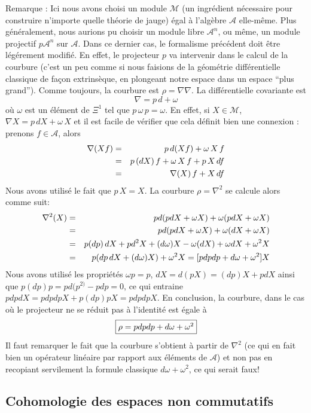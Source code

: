 Remarque : Ici nous avons choisi un module $\mathcal M$ (un ingr\'edient 
n\'ecessaire pour construire n'importe quelle th\'eorie de jauge)
\'egal \`a l'alg\`ebre ${\mathcal A}$ elle-m\^eme. Plus g\'en\'eralement, nous 
aurions pu choisir un module libre ${\mathcal A}^n$, ou m\^eme,  un 
module projectif $p{\mathcal A}^n$ sur $\mathcal A$. 
Dans ce dernier cas, le formalisme pr\'ec\'edent doit \^etre 
l\'eg\'erement modifi\'e. En effet, le projecteur $p$ va intervenir dans 
le calcul de la courbure (c'est un peu comme si nous faisions de la 
g\'eom\'etrie diff\'erentielle classique de fa\c con extrins\`eque, 
en plongeant notre espace dans un espace ``plus grand''). Comme 
toujours, la courbure est $\rho  =  \nabla \nabla$. La 
diff\'erentielle covariante est $$ \nabla = p \, d + \omega$$ o\`u 
$\omega$ est un \'el\'ement de $\Xi^{1}$ tel que $p \, \omega \, p = \omega$. En effet, si $X \in 
{\mathcal M}$, $\nabla X = p \, dX + \omega \, X$ et il est facile de 
v\'erifier que cela d\'efinit bien une connexion : prenons $f \in 
{\mathcal A}$, alors
\begin{eqnarray*}
\nabla(Xf) &=& p \, d(Xf) + \omega \, X \, f \cr
{} &=& p \, (dX) \, f + \omega \, X \, f + p \, X \, df \cr
{} &=& \nabla(X) \, f + X \, df
\end{eqnarray*}
Nous avons utilis\'e le fait que $p \, X = X$.
La courbure $\rho = \nabla^{2}$ se calcule alors comme suit:
\begin{eqnarray*}
\nabla^{2}(X) &=& pd(pdX + \omega X) + \omega(p dX + \omega X) \cr
{} &=& pd(pdX + \omega X) + \omega  (dX + \omega X) \cr
{} &=& p(dp) \, dX + pd^{2}X + (d\omega ) X - \omega (dX) + \omega  dX + \omega ^{2} X \cr
{} &=& p(dp\,  dX + (d\omega ) X) + \omega ^{2} X = [p dp dp + d\omega  + \omega ^{2}] X
\end{eqnarray*}
Nous avons utilis\'e les propri\'et\'es $\omega p=p$, $dX=d(pX)=(dp)X+pdX$ 
ainsi que $p(dp)p = pd(p^{2)}-pdp=0$, ce qui entraine 
$pdpdX=pdpdpX+p(dp)pX=pdpdpX.$ En conclusion, la courbure, dans le cas 
o\`u le projecteur ne se r\'eduit pas \`a l'identit\'e est \'egale \`a
$$
\mbox{\fbox{$
\rho = pdpdp + d\omega  + \omega ^{2}
$}}
$$
Il faut remarquer le fait que la courbure s'obtient \`a partir de 
$\nabla^{2}$ (ce qui en fait bien un op\'erateur lin\'eaire par 
rapport aux \'el\'ements de $\mathcal A$) et non pas en recopiant servilement la
formule classique $d\omega + \omega^{2}$, ce qui serait faux!

\subsection{Cohomologie des espaces non commutatifs}

